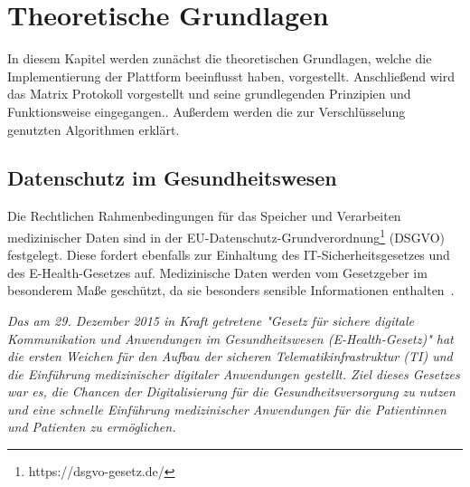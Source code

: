     \newpage
    \chapter{Theoretische Grundlagen}\label{ch:theoretische-grundlagen}
    In diesem Kapitel werden zunächst die theoretischen Grundlagen, welche die Implementierung der Plattform beeinflusst haben, vorgestellt.
    Anschließend wird das Matrix Protokoll vorgestellt und seine grundlegenden Prinzipien und Funktionsweise eingegangen..
    Außerdem werden die zur Verschlüsselung genutzten Algorithmen erklärt.

    \section{Datenschutz im Gesundheitswesen}\label{sec:datenschutz-im-gesundheitswesen}
    Die Rechtlichen Rahmenbedingungen für das Speicher und Verarbeiten medizinischer Daten sind in der EU-Datenschutz-Grundverordnung\footnote{https://dsgvo-gesetz.de/} (DSGVO) festgelegt.
    Diese fordert ebenfalls zur Einhaltung des IT-Sicherheitsgesetzes und des E-Health-Gesetzes auf.
    Medizinische Daten werden vom Gesetzgeber im besonderem Maße geschützt, da sie besonders sensible Informationen enthalten~\cite{datenschutzimgesundeitswesen}.

    \textit{Das am 29. Dezember 2015 in Kraft getretene "Gesetz für sichere digitale Kommunikation und Anwendungen im Gesundheitswesen (E-Health-Gesetz)" hat die ersten Weichen für den Aufbau der sicheren Telematikinfrastruktur (TI) und die Einführung medizinischer digitaler Anwendungen gestellt.
    Ziel dieses Gesetzes war es, die Chancen der Digitalisierung für die Gesundheitsversorgung zu nutzen und eine schnelle Einführung medizinischer Anwendungen für die Patientinnen und Patienten zu ermöglichen.}~\cite{ehealthgesetz}

